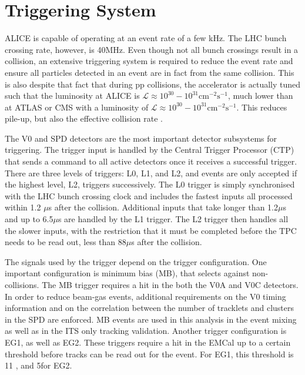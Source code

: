 \section{Triggering System}
\label{sec:trigger}


ALICE is capable of operating at an event rate of a few kHz. The LHC bunch crossing rate, however, is 40MHz. Even though not all bunch crossings result in a collision, an extensive triggering system is required to reduce the event rate and ensure all particles detected in an event are in fact from the same collision. This is also despite that fact that during pp collisions, the accelerator is actually tuned such that the luminosity at ALICE is $\mathcal{L}\approx 10^{30}-10^{31}\text{cm}^{-2}\text{s}^{-1}$, much lower than at ATLAS or CMS with a luminosity of $\mathcal{L}\approx 10^{30}-10^{31} \text{cm}^{-2}\text{s}^{-1}$. This reduces pile-up, but also the effective collision rate \cite{Wenninger:2668326}.

 The V0 and SPD detectors are the most important detector subsystems for triggering. The trigger input is handled by the Central Trigger Processor (CTP) that sends a command to all active detectors once it receives a successful trigger. There are three levels of triggers: L0, L1, and L2, and events are only accepted if the highest level, L2, triggers successively. The L0 trigger is simply synchronised with the LHC bunch crossing clock and includes the fastest inputs all processed within 1.2 $\mu$s after the collision. Additional inputs that take longer than 1.2$\mu$s and up to 6.5$\mu$s are handled by the L1 trigger. The L2 trigger then handles all the slower inputs, with the restriction that it must be completed before the TPC needs to be read out, less than $88\mu$s after the collision. 

The signals used by the trigger depend on the trigger configuration. One important configuration is minimum bias (MB), that selects against non-collisions. The MB trigger requires a hit in the both the V0A and V0C detectors. In order to reduce beam-gas events, additional requirements on the V0 timing information and on the correlation between the number of tracklets and clusters in the SPD are enforced. MB events are used in this analysis in the event mixing as well as in the ITS only tracking validation. Another trigger configuration is EG1, as well as EG2. These triggers require a hit in the EMCal up to a certain threshold before tracks can be read out for the event. For EG1, this threshold is 11 \GeVc, and 5\GeVc for EG2. 

